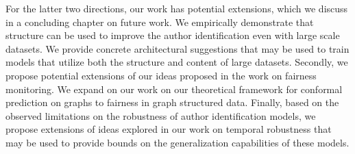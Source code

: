 For the latter two directions, our work has potential extensions, which we discuss in a concluding chapter on future work.
We empirically demonstrate that structure can be used to improve the author identification even with large scale datasets.
We provide concrete architectural suggestions that may be used to train models that utilize both the structure and content of large datasets.
Secondly, we propose potential extensions of our ideas proposed in the work on fairness monitoring.
We expand on our work on our theoretical framework for conformal prediction on graphs to fairness in graph structured data.
Finally, based on the observed limitations on the robustness of author identification models, we propose extensions of ideas explored in our work on temporal robustness that may be used to provide bounds on the generalization capabilities of these models.

\endinput